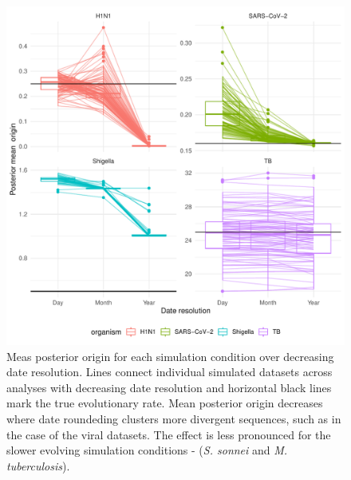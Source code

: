 \documentclass{article}
\begin{document}
\begin{figure}[h!]
    \centering
    \includegraphics{sim_origin_trajectory.pdf}
    \caption{Meas posterior origin for each simulation condition over decreasing date resolution. Lines connect individual simulated datasets across analyses with decreasing date resolution and horizontal black lines mark the true evolutionary rate. Mean posterior origin decreases  where date roundeding clusters more divergent sequences, such as in the case of the viral datasets. The effect is less pronounced for the slower evolving simulation conditions - (\textit{S. sonnei} and \textit{M. tuberculosis}).}
    \label{fig:simOrigin}
\end{figure}
\end{document}
